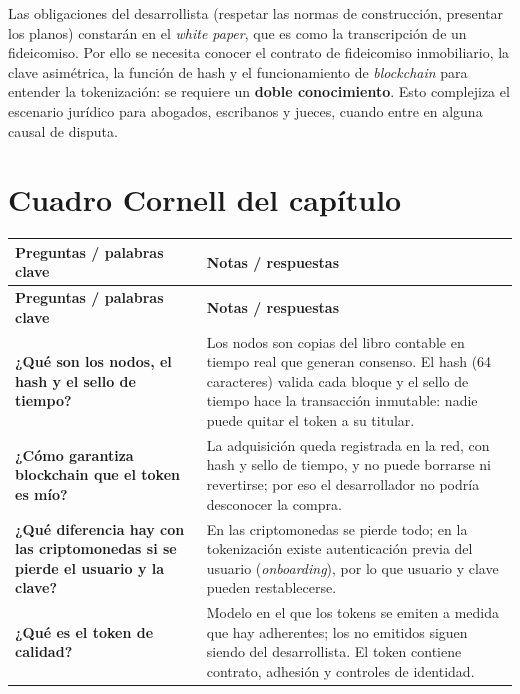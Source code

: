 \documentclass[12pt,oneside]{book}
\begin{document}
Las obligaciones del desarrollista (respetar las normas de construcción, presentar los planos) constarán en el \textit{white paper}, que es como la transcripción de un fideicomiso. Por ello se necesita conocer el contrato de fideicomiso inmobiliario, la clave asimétrica, la función de hash y el funcionamiento de \textit{blockchain} para entender la tokenización: se requiere un \textbf{doble conocimiento}. Esto complejiza el escenario jurídico para abogados, escribanos y jueces, cuando entre en alguna causal de disputa.

\section{Cuadro Cornell del capítulo}

\begin{longtable}{
    >{\raggedright\arraybackslash}p{}
    >{\raggedright\arraybackslash}p{}
}
\toprule
\textbf{Preguntas / palabras clave} & \textbf{Notas / respuestas} \\
\midrule
\endfirsthead
\toprule
\textbf{Preguntas / palabras clave} & \textbf{Notas / respuestas} \\
\midrule
\endhead
\bottomrule
\endfoot

\textbf{¿Qué son los nodos, el hash y el sello de tiempo?} &
Los nodos son copias del libro contable en tiempo real que generan consenso. El hash (64 caracteres) valida cada bloque y el sello de tiempo hace la transacción inmutable: nadie puede quitar el token a su titular. \\[0.5em]

\textbf{¿Cómo garantiza blockchain que el token es mío?} &
La adquisición queda registrada en la red, con hash y sello de tiempo, y no puede borrarse ni revertirse; por eso el desarrollador no podría desconocer la compra. \\[0.5em]

\textbf{¿Qué diferencia hay con las criptomonedas si se pierde el usuario y la clave?} &
En las criptomonedas se pierde todo; en la tokenización existe autenticación previa del usuario (\textit{onboarding}), por lo que usuario y clave pueden restablecerse. \\[0.5em]

\textbf{¿Qué es el token de calidad?} &
Modelo en el que los tokens se emiten a medida que hay adherentes; los no emitidos siguen siendo del desarrollista. El token contiene contrato, adhesión y controles de identidad. \\[0.5em]


\end{longtable}
\end{document}
